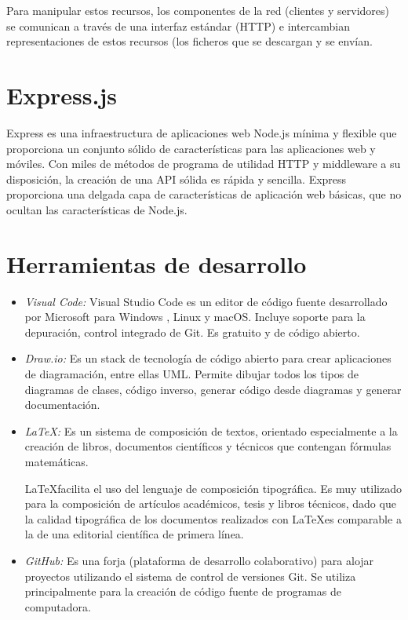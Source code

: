  Para manipular estos recursos, los componentes de la red (clientes y servidores) se comunican a través de una interfaz estándar (HTTP) e intercambian representaciones de estos recursos (los ficheros que se descargan y se envían.
 
\section{Express.js}

Express es una infraestructura de aplicaciones web Node.js mínima y flexible que proporciona un conjunto sólido de características para las aplicaciones web y móviles.
Con miles de métodos de programa de utilidad HTTP y middleware a su disposición, la creación de una API sólida es rápida y sencilla.
Express proporciona una delgada capa de características de aplicación web básicas, que no ocultan las características de Node.js.

\section{Herramientas de desarrollo}

\begin{itemize}

\item \emph {Visual Code:} Visual Studio Code es un editor de código fuente desarrollado por Microsoft para Windows , Linux y macOS. Incluye soporte para la depuración, control integrado de Git. Es gratuito y de código abierto.

\item \emph {Draw.io:} Es un stack de tecnología de código abierto para crear aplicaciones de diagramación, entre ellas UML.
Permite dibujar todos los tipos de diagramas de clases, código inverso, generar código desde diagramas y generar documentación.

\item \emph{\LaTeX:} Es un sistema de composición de textos, orientado especialmente a la creación de libros, documentos científicos y técnicos que contengan fórmulas matemáticas.

\LaTeX facilita el uso del lenguaje de composición tipográfica. Es muy utilizado para la composición de artículos académicos, tesis y libros técnicos, dado que la calidad tipográfica de los documentos realizados con \LaTeX es comparable a la de una editorial científica de primera línea.

\item \emph{GitHub:} Es una forja (plataforma de desarrollo colaborativo) para alojar proyectos utilizando el sistema de control de versiones Git. Se utiliza principalmente para la creación de código fuente de programas de computadora.

\end{itemize}

